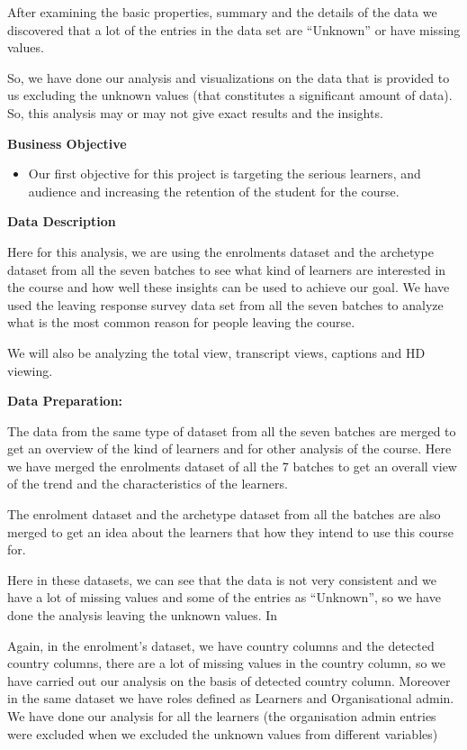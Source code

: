 \documentclass[
]{article}
\providecommand{\tightlist}{%
  \setlength{\itemsep}{0pt}\setlength{\parskip}{0pt}}
\begin{document}
After examining the basic properties, summary and the details of the
data we discovered that a lot of the entries in the data set are
``Unknown'' or have missing values.

So, we have done our analysis and visualizations on the data that is
provided to us excluding the unknown values (that constitutes a
significant amount of data). So, this analysis may or may not give exact
results and the insights.

\textbf{Business Objective }

\begin{itemize}
\tightlist
\item
  Our first objective for this project is targeting the serious
  learners, and audience and increasing the retention of the student for
  the course.
\end{itemize}

\textbf{Data Description }

Here for this analysis, we are using the enrolments dataset and the
archetype dataset from all the seven batches to see what kind of
learners are interested in the course and how well these insights can be
used to achieve our goal. We have used the leaving response survey data
set from all the seven batches to analyze what is the most common reason
for people leaving the course.

We will also be analyzing the total view, transcript views, captions and
HD viewing.

\textbf{Data Preparation: }

The data from the same type of dataset from all the seven batches are
merged to get an overview of the kind of learners and for other analysis
of the course. Here we have merged the enrolments dataset of all the 7
batches to get an overall view of the trend and the characteristics of
the learners.

The enrolment dataset and the archetype dataset from all the batches are
also merged to get an idea about the learners that how they intend to
use this course for.

Here in these datasets, we can see that the data is not very consistent
and we have a lot of missing values and some of the entries as
``Unknown'', so we have done the analysis leaving the unknown values. In

Again, in the enrolment's dataset, we have country columns and the
detected country columns, there are a lot of missing values in the
country column, so we have carried out our analysis on the basis of
detected country column. Moreover in the same dataset we have roles
defined as Learners and Organisational admin. We have done our analysis
for all the learners (the organisation admin entries were excluded when
we excluded the unknown values from different variables)
\end{document}
